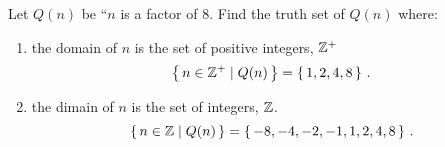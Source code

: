 \guard



\begin{exmp}
\label{exmp:truthSetOverIntegers}
  Let $Q(n)$ be ``$n$ is a factor of $8$.
  Find the truth set of $Q(n)$ where:
  \begin{enumerate}
    \item the domain of $n$ is the set of positive integers, $\mathbb{Z}^+$
      \[ \left\{\, n\in\mathbb{Z}^+ \mid Q(n)\,\right\} = \left\{\,1,2,4,8\,\right\}\,.\]
    \item the dimain of $n$ is the set of integers, $\mathbb{Z}$.
      \[ \left\{\, n\in\mathbb{Z} \mid Q(n)\,\right\} = \left\{\,-8,-4,-2,-1,1,2,4,8\,\right\}\,.\]
  \end{enumerate}
\end{exmp}
